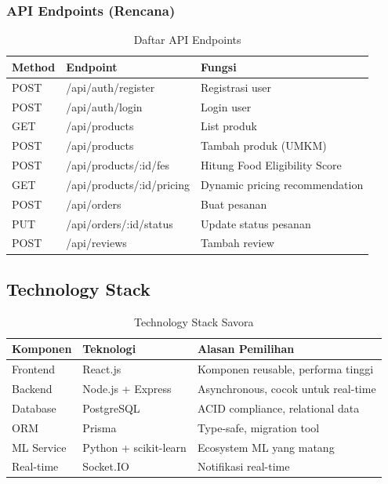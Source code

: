 \subsubsection{API Endpoints (Rencana)}
\begin{table}[H]
\centering
\caption{Daftar API Endpoints}
\label{tab:api_endpoints}
\small
\begin{tabularx}{\textwidth}{|l|X|l|}
\hline
\textbf{Method} & \textbf{Endpoint} & \textbf{Fungsi} \\
\hline
POST & /api/auth/register & Registrasi user \\
\hline
POST & /api/auth/login & Login user \\
\hline
GET & /api/products & List produk \\
\hline
POST & /api/products & Tambah produk (UMKM) \\
\hline
POST & /api/products/:id/fes & Hitung Food Eligibility Score \\
\hline
GET & /api/products/:id/pricing & Dynamic pricing recommendation \\
\hline
POST & /api/orders & Buat pesanan \\
\hline
PUT & /api/orders/:id/status & Update status pesanan \\
\hline
POST & /api/reviews & Tambah review \\
\hline
\end{tabularx}
\end{table}

\subsection{Technology Stack}

\begin{table}[H]
\centering
\caption{Technology Stack Savora}
\label{tab:tech_stack_implementation}
\begin{tabularx}{\textwidth}{|l|X|X|}
\hline
\textbf{Komponen} & \textbf{Teknologi} & \textbf{Alasan Pemilihan} \\
\hline
Frontend & React.js & Komponen reusable, performa tinggi \\
\hline
Backend & Node.js + Express & Asynchronous, cocok untuk real-time \\
\hline
Database & PostgreSQL & ACID compliance, relational data \\
\hline
ORM & Prisma & Type-safe, migration tool \\
\hline
ML Service & Python + scikit-learn & Ecosystem ML yang matang \\
\hline
Real-time & Socket.IO & Notifikasi real-time \\
\hline
\end{tabularx}
\end{table}
